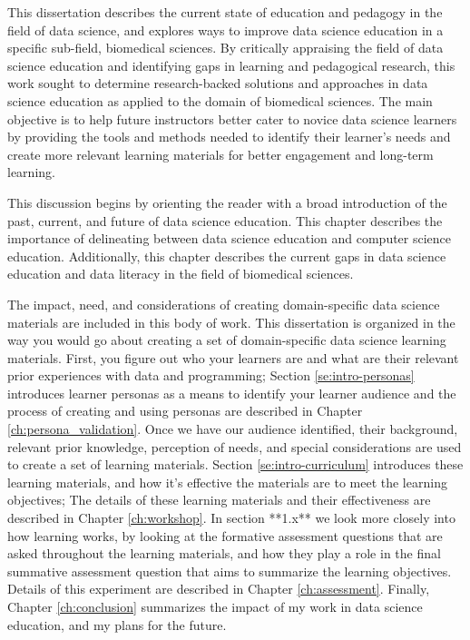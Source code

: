 \documentclass[010-intro.tex]{subfiles}
\begin{document}
This dissertation describes the current state of education and pedagogy in the field of data science,
and explores ways to improve data science education in a specific sub-field, biomedical sciences.
By critically appraising the field of data science education
and identifying gaps in learning and pedagogical research,
this work sought to determine research-backed solutions and approaches in data science education
as applied to the domain of biomedical sciences.
The main objective is to help future instructors better cater to novice data science learners
by providing the tools and methods needed to identify their learner's needs and create
more relevant learning materials for better engagement and long-term learning.

This discussion begins by orienting the reader with
a broad introduction of the past, current, and future of data science education.
This chapter describes the importance of delineating between
data science education and computer science education.
Additionally, this chapter describes the current gaps in
data science education and data literacy in the field of biomedical sciences.

The impact, need, and considerations of creating domain-specific data science materials
are included in this body of work.
This dissertation is organized in the way you would go about creating
a set of domain-specific data science learning materials.
First, you figure out who your learners are and what are their relevant prior experiences with
data and programming;
Section \ref{se:intro-personas} introduces learner personas as a means to identify your learner audience
and the process of creating and using personas are described in Chapter \ref{ch:persona_validation}.
Once we have our audience identified,
their background, relevant prior knowledge, perception of needs, and special considerations
are used to create a set of learning materials.
Section \ref{se:intro-curriculum} introduces these learning materials,
and how it's effective the materials are to meet the learning objectives;
The details of these learning materials and their effectiveness are described in Chapter \ref{ch:workshop}.
In section **1.x** we look more closely into how learning works, %
by looking at the formative assessment questions that are asked throughout the learning materials,
and how they play a role in the final summative assessment question that aims to summarize the learning objectives.
Details of this experiment are described in Chapter \ref{ch:assessment}.
Finally, Chapter \ref{ch:conclusion} summarizes the impact of my work in data science education,
and my plans for the future.
\end{document}

